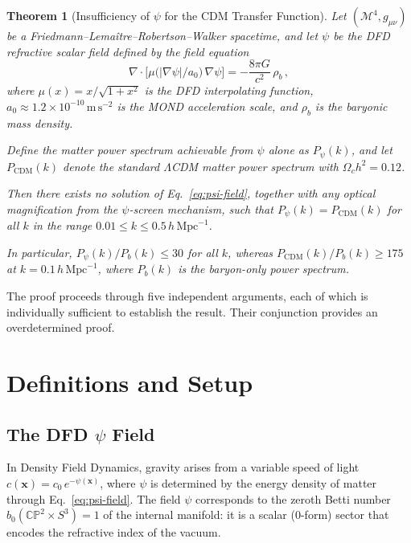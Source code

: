\documentclass[12pt,a4paper]{article}
\newcommand{\hMpc}{\,h\,\mathrm{Mpc}^{-1}}
\newcommand{\CP}{\mathbb{CP}}
\newcommand{\Sph}{S}
\newtheorem{theorem}{Theorem}
\begin{document}
\begin{theorem}[Insufficiency of $\psi$ for the CDM Transfer Function]
\label{thm:main}
Let $(\mathcal{M}^4, g_{\mu\nu})$ be a Friedmann--Lema\^{i}tre--Robertson--Walker
spacetime, and let $\psi$ be the DFD refractive scalar field defined by
the field equation
\begin{equation}
\label{eq:psi-field}
\nabla \cdot \bigl[\mu\bigl(|\nabla\psi|/a_0\bigr)\,\nabla\psi\bigr]
= -\frac{8\pi G}{c^2}\,\rho_b\,,
\end{equation}
where $\mu(x) = x/\sqrt{1+x^2}$ is the DFD interpolating function,
$a_0 \approx 1.2 \times 10^{-10}\,\mathrm{m\,s}^{-2}$ is the
MOND acceleration scale, and $\rho_b$ is the baryonic mass density.

Define the matter power spectrum achievable from $\psi$ alone as
$P_\psi(k)$, and let $P_{\mathrm{CDM}}(k)$ denote the standard
$\Lambda$CDM matter power spectrum with $\Omega_c h^2 = 0.12$.

Then there exists no solution of Eq.~\eqref{eq:psi-field}, together
with any optical magnification from the $\psi$-screen mechanism, such
that $P_\psi(k) = P_{\mathrm{CDM}}(k)$ for all $k$ in the range
$0.01 \leq k \leq 0.5\hMpc$.

In particular, $P_\psi(k)/P_b(k) \leq 30$ for all $k$, whereas
$P_{\mathrm{CDM}}(k)/P_b(k) \geq 175$ at $k = 0.1\hMpc$, where
$P_b(k)$ is the baryon-only power spectrum.
\end{theorem}

The proof proceeds through five independent arguments, each of which
is individually sufficient to establish the result. Their conjunction
provides an overdetermined proof.

\section{Definitions and Setup}
\label{sec:setup}

\subsection{The DFD $\psi$ Field}

In Density Field Dynamics, gravity arises from a variable speed of light
$c(\mathbf{x}) = c_0\,e^{-\psi(\mathbf{x})}$, where $\psi$ is determined
by the energy density of matter through Eq.~\eqref{eq:psi-field}.
The field $\psi$ corresponds to the zeroth Betti number
$b_0(\CP^2 \times \Sph^3) = 1$ of the internal manifold: it is a
scalar (0-form) sector that encodes the refractive index of the vacuum.
\end{document}
